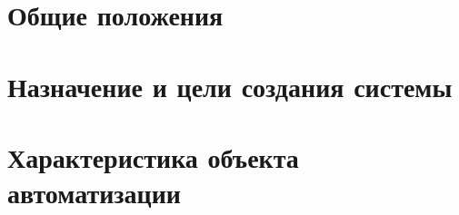 
\def \notincludehead{}




%  
\newcommand{\curversion}{1} 





   \maketitle
 	
   
% 	

	\scriptsize
	\setcounter{tocdepth}{4}
	\tableofcontents
	\normalsize
	\newpage

    \section{Общие положения}
	
    \newpage

	\section{Назначение и цели создания системы}
	
    \newpage

	\section{Характеристика объекта автоматизации}
	
    \newpage


    


